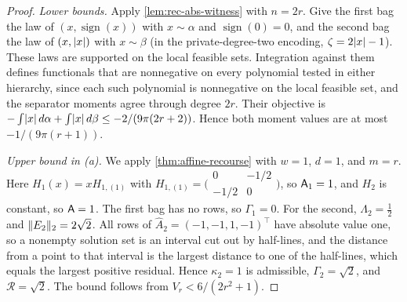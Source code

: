 \begin{proof}
\emph{Lower bounds.} Apply \cref{lem:rec-abs-witness} with $n=2r$. Give the
first bag the law of $(x,\operatorname{sign}(x))$ with $x\sim\alpha$ and
$\operatorname{sign}(0)=0$, and the second bag the law of $(x,\lvert x\rvert)$ with
$x\sim\beta$ (in the private-degree-two encoding, $\zeta=2\lvert x\rvert-1$). These
laws are supported on the local feasible sets. Integration against them
defines functionals that are nonnegative on every polynomial tested in
either hierarchy, since each such polynomial is nonnegative on the local
feasible set, and the separator moments agree through degree $2r$. Their
objective is $-\int\lvert x\rvert\,d\alpha+\int\lvert x\rvert\,d\beta\le-2/(9\pi(2r+2))$.
Hence both moment values are at most $-1/(9\pi(r+1))$.

\emph{Upper bound in (a).} We apply \cref{thm:affine-recourse} with $w=1$,
$d=1$, and $m=r$. Here $H_1(x)=xH_{1,(1)}$ with
$H_{1,(1)}=\bigl(\begin{smallmatrix}0&-1/2\\-1/2&0\end{smallmatrix}\bigr)$,
so $\mathsf{A}_1=1$, and $H_2$ is constant, so $\mathsf{A}=1$. The first bag has no
rows, so $\Gamma_1=0$. For the second, $\Lambda_2=\tfrac12$ and
$\lVert E_2\rVert_2=2\sqrt2$. All rows of $\widehat A_2=(-1,-1,1,-1)^\top$ have
absolute value one, so a nonempty solution set is an interval cut out by
half-lines, and the distance from a point to that interval is the largest
distance to one of the half-lines, which equals the largest positive
residual. Hence $\kappa_2=1$ is admissible, $\Gamma_2=\sqrt2$, and
$\mathcal R=\sqrt2$. The bound follows from $V_r<6/(2r^2+1)$.


\end{proof}
